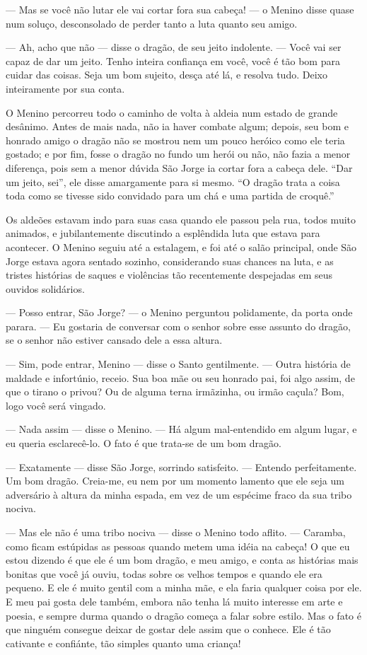— Mas se você não lutar ele vai cortar fora sua cabeça! — o Menino
disse quase num soluço, desconsolado de perder tanto a luta quanto
seu amigo.

— Ah, acho que não — disse o dragão, de seu jeito indolente. — Você
vai ser capaz de dar um jeito. Tenho inteira confiança em você, você
é tão bom para cuidar das coisas. Seja um bom sujeito, desça até lá,
e resolva tudo. Deixo inteiramente por sua conta.

O Menino percorreu todo o caminho de volta à aldeia num estado de
grande desânimo. Antes de mais nada, não ia haver combate algum;
depois, seu bom e honrado amigo o dragão não se mostrou nem um pouco
heróico como ele teria gostado; e por fim, fosse o dragão no fundo um
herói ou não, não fazia a menor diferença, pois sem a menor dúvida
São Jorge ia cortar fora a cabeça dele. “Dar um jeito, sei”, ele
disse amargamente para si mesmo. “O dragão trata a coisa toda como se
tivesse sido convidado para um chá e uma partida de croquê.”

Os aldeões estavam indo para suas casa quando ele passou pela rua,
todos muito animados, e jubilantemente discutindo a esplêndida luta
que estava para acontecer. O Menino seguiu até a estalagem, e foi até
o salão principal, onde São Jorge estava agora sentado sozinho,
considerando suas chances na luta, e as tristes histórias de saques e
violências tão recentemente despejadas em seus ouvidos solidários.

— Posso entrar, São Jorge? — o Menino perguntou polidamente, da porta
onde parara. — Eu gostaria de conversar com o senhor sobre esse
assunto do dragão, se o senhor não estiver cansado dele a essa
altura.

— Sim, pode entrar, Menino — disse o Santo gentilmente. — Outra
história de maldade e infortúnio, receio. Sua boa mãe ou seu honrado
pai, foi algo assim, de que o tirano o privou? Ou de alguma terna
irmãzinha, ou irmão caçula? Bom, logo você será vingado.

— Nada assim — disse o Menino. — Há algum mal-entendido em algum
lugar, e eu queria esclarecê-lo. O fato é que trata-se de um bom
dragão.

— Exatamente — disse São Jorge, sorrindo satisfeito. — Entendo
perfeitamente. Um bom dragão. Creia-me, eu nem por um momento lamento
que ele seja um adversário à altura da minha espada, em vez de um
espécime fraco da sua tribo nociva.

— Mas ele não é uma tribo nociva — disse o Menino todo aflito. —
Caramba, como ficam estúpidas as pessoas quando metem uma idéia na
cabeça! O que eu estou dizendo é que ele é um bom dragão, e meu
amigo, e conta as histórias mais bonitas que você já ouviu, todas
sobre os velhos tempos e quando ele era pequeno. E ele é muito gentil
com a minha mãe, e ela faria qualquer coisa por ele. E meu pai gosta
dele também, embora não tenha lá muito interesse em arte e poesia, e
sempre durma quando o dragão começa a falar sobre estilo. Mas o fato
é que ninguém consegue deixar de gostar dele assim que o conhece. Ele
é tão cativante e confiánte, tão simples quanto uma criança!

